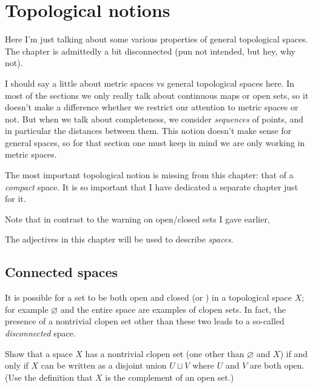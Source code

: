 \chapter{Topological notions}
\label{ch:top_more}
Here I'm just talking about some various properties of general topological spaces.
The chapter is admittedly a bit disconnected (pun not intended, but hey, why not).

I should say a little about metric spaces vs general topological spaces here.
In most of the sections we only really talk about continuous maps or open sets,
so it doesn't make a difference whether we restrict our attention
to metric spaces or not.
But when we talk about completeness, we consider \emph{sequences} of points,
and in particular the distances between them.
This notion doesn't make sense for general spaces, so for that section one must
keep in mind we are only working in metric spaces.

The most important topological notion is missing from this chapter:
that of a \emph{compact} space.
It is so important that I have dedicated a separate chapter just for it.

Note that in contrast to the warning on open/closed sets I gave earlier,
\begin{moral}
	The adjectives in this chapter will be used to describe \emph{spaces}.
\end{moral}


\section{Connected spaces}
It is possible for a set to be both open and closed (or ) in a
topological space $X$;
for example $\varnothing$ and the entire space are examples of clopen sets.
In fact, the presence of a nontrivial clopen set other than these two leads
to a so-called \emph{disconnected} space.

\begin{ques}
	Show that a space $X$ has a nontrivial clopen set
	(one other than $\varnothing$ and $X$)
	if and only if $X$ can be written as a disjoint union $U \sqcup V$
	where $U$ and $V$ are both open.
	(Use the definition that $X$ is the complement of an open set.)
\end{ques}


